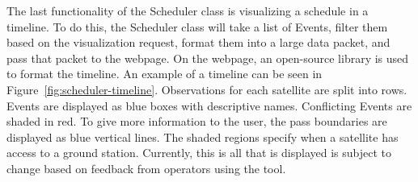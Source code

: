 The last functionality of the Scheduler class is visualizing a schedule in a
timeline. To do this, the Scheduler class will take a list of Events, filter
them based on the visualization request, format them into a large data packet,
and pass that packet to the webpage. On the webpage, an open-source library is
used to format the timeline. An example of a timeline can be seen in
Figure~\ref{fig:scheduler-timeline}. Observations for each satellite are split
into rows. Events are displayed as blue boxes with descriptive names.
Conflicting Events are shaded in red. To give more information to the user, the
pass boundaries are displayed as blue vertical lines. The shaded regions
specify when a satellite has access to a ground station.  Currently, this is
all that is displayed is subject to change based on feedback from operators
using the tool.










